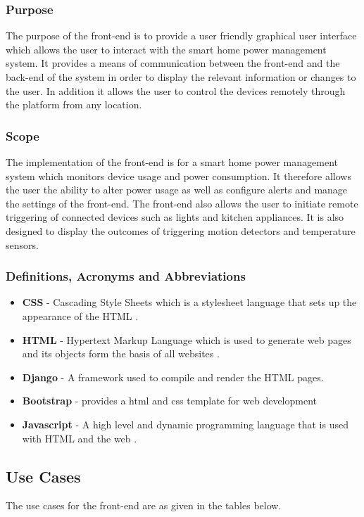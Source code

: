 \documentclass[10pt,twocolumn]{witseiepaper}
\begin{document}
	\subsubsection{Purpose}
	The purpose of the front-end is to provide a user friendly graphical user interface which allows the user to interact with the smart home power management system. It provides a means of communication between the front-end and the back-end of the system in order to display the relevant information or changes to the user. In addition it allows the user to control the devices remotely through the platform from any location.
	
	\subsubsection{Scope}
	The implementation of the front-end is for a smart home power management system which monitors device usage and power consumption. It therefore allows the user the ability to alter power usage as well as configure alerts and manage the settings of the front-end. The front-end also allows the user to initiate remote triggering of connected devices such as lights and kitchen appliances. It is also designed to display the outcomes of triggering motion detectors and temperature sensors.
	
	\subsubsection{Definitions, Acronyms and Abbreviations}
	
	\begin{itemize}
		\item \textbf{CSS} - Cascading Style Sheets which is a stylesheet language that sets up the appearance of the HTML \cite{CSS}.
		\item \textbf{HTML} - Hypertext Markup Language which is used to generate web pages and its objects form the basis of all websites \cite{HTML}.
		\item \textbf{Django} - A framework used to compile and render the HTML pages.
		\item \textbf{Bootstrap} - provides a html and css template for web development
		\item \textbf{Javascript} - A high level and dynamic programming language that is used with HTML and the web \cite{Javascript}.
	\end{itemize}
	\newpage
	\subsection{Use Cases}
	The use cases for the front-end are as given in the tables below. 
	
\end{document}
